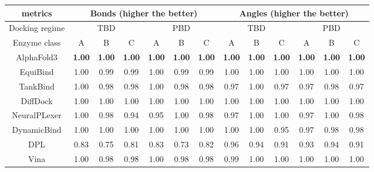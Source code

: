 \documentclass[12pt, a4paper, portrait]{article}
\begin{document}
    \begin{table}
        \begin{tabular}{|c|*{6}{c}|*{6}{c}|}
            \hline
            metrics & 
            \multicolumn{6}{|c|}{Bonds (\textbf{higher} the better)} & \multicolumn{6}{|c|}{Angles (\textbf{higher} the better)} \\
            \hline

            Docking regime & 
            \multicolumn{3}{|c|}{TBD} & \multicolumn{3}{|c|}{PBD} &
            \multicolumn{3}{|c|}{TBD} & \multicolumn{3}{|c|}{PBD} \\
            \hline

            Enzyme class & A & B & C & A & B & C &      
            A & B & C & A & B & C \\
            \hline

            AlphaFold3&\textbf{1.00}&\textbf{1.00}&\textbf{1.00}&\textbf{1.00}&\textbf{1.00}&\textbf{1.00}&\textbf{1.00}&\textbf{1.00}&\textbf{1.00}&\textbf{1.00}&\textbf{1.00}&\textbf{1.00}\\ 
            EquiBind&1.00&0.99&0.99&1.00&0.99&0.99&1.00&1.00&1.00&1.00&1.00&1.00\\ 
            TankBind&1.00&0.98&0.98&1.00&0.98&0.98&0.97&1.00&0.97&0.97&0.98&0.97\\ 
            DiffDock&1.00&1.00&1.00&1.00&1.00&1.00&1.00&1.00&1.00&1.00&1.00&1.00\\ 
            NeuralPLexer&1.00&0.98&0.94&0.95&1.00&0.98&0.97&1.00&1.00&0.97&1.00&0.98\\ 
            DynamicBind&1.00&1.00&1.00&1.00&1.00&1.00&1.00&1.00&0.95&0.97&0.98&0.98\\ 
            DPL&0.83&0.75&0.81&0.83&0.73&0.82&0.96&0.94&0.91&0.93&0.94&0.91\\ 
            \hline
            Vina&1.00&0.98&0.98&1.00&0.98&0.98&0.99&1.00&1.00&1.00&1.00&1.00\\ 
            \hline

        \end{tabular}
    \end{table}
\end{document}
